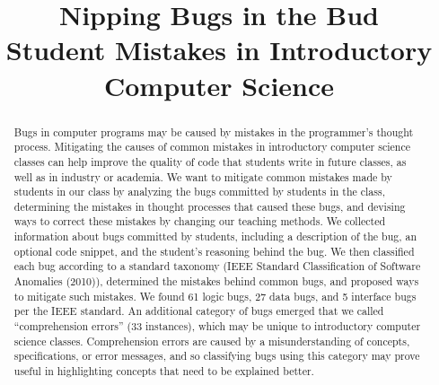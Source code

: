 \documentclass{sig-alternate}
\begin{document}
\title{Nipping Bugs in the Bud\\ Student Mistakes in Introductory Computer Science}
\author{
\alignauthor
}
\maketitle

\setcounter{page}{1}

\def\numlogicIEEE{64 }
\def\numdataIEEE{30 }
\def\numinterfaceIEEE{5 }
\def\numotherIEEE{27 }

\def\numlogic{61 }
\def\numdata{27 }
\def\numinterface{5 }
\def\numcomp{33 }
\def\numtotal{126 }
\def\numedge{31 }

\begin{abstract}
Bugs in computer programs may be caused by mistakes in the programmer's thought process. Mitigating the causes of common mistakes in introductory computer science classes can help improve the quality of code that students write in future classes, as well as in industry or academia. We want to mitigate common mistakes made by students in our class by analyzing the bugs committed by students in the class, determining the mistakes in thought processes that caused these bugs, and devising ways to correct these mistakes by changing our teaching methods. We collected information about bugs committed by students, including a description of the bug, an optional code snippet, and the student's reasoning behind the bug. We then classified each bug according to a standard taxonomy (IEEE Standard Classification of Software Anomalies (2010)), determined the mistakes behind common bugs, and proposed ways to mitigate such mistakes. We found \numlogic logic bugs, \numdata data bugs, and \numinterface interface bugs per the IEEE standard. An additional category of bugs emerged that we called ``comprehension errors'' (\numcomp instances), which may be unique to introductory computer science classes. Comprehension errors are caused by a misunderstanding of concepts, specifications, or error messages, and so classifying bugs using this category may prove useful in highlighting concepts that need to be explained better.

\end{abstract}
\end{document}
